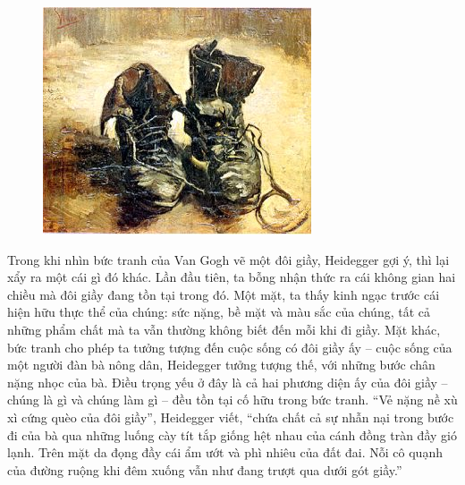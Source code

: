 \documentclass[../main.tex]{subfiles}
\begin{document}
\begin{multicols}{2}
\begin{figure}
	\centering
	\includegraphics[width=\textwidth]{../img/tho060508_1.jpg}
	\caption{}
\end{figure}
 Trong khi nhìn bức tranh của Van Gogh vẽ một đôi giầy, Heidegger gợi ý, thì lại xẩy ra một cái gì đó khác. Lần đầu tiên, ta bỗng nhận thức ra cái không gian hai chiều mà đôi giầy đang tồn tại trong đó. Một mặt, ta thấy kinh ngạc trước cái hiện hữu thực thể của chúng: sức nặng, bề mặt và màu sắc của chúng, tất cả những phẩm chất mà ta vẫn thường không biết đến mỗi khi đi giầy. Mặt khác, bức tranh cho phép ta tưởng tượng đến cuộc sống có đôi giầy ấy – cuộc sống của một người đàn bà nông dân, Heidegger tưởng tượng thế, với những bước chân nặng nhọc của bà. Điều trọng yếu ở đây là cả hai phương diện ấy của đôi giầy – chúng là gì và chúng làm gì – đều tồn tại cố hữu trong bức tranh. “Vẻ nặng nề xù xì cứng quèo của đôi giầy”, Heidegger viết, “chứa chất cả sự nhẫn nại trong bước đi của bà qua những luống cày tít tắp giống hệt nhau của cánh đồng tràn đầy gió lạnh. Trên mặt da đọng đầy cái ẩm ướt và phì nhiêu của đất đai. Nỗi cô quạnh của đường ruộng khi đêm xuống vẫn như đang trượt qua dưới gót giầy.” 


\end{multicols}
\end{document}
